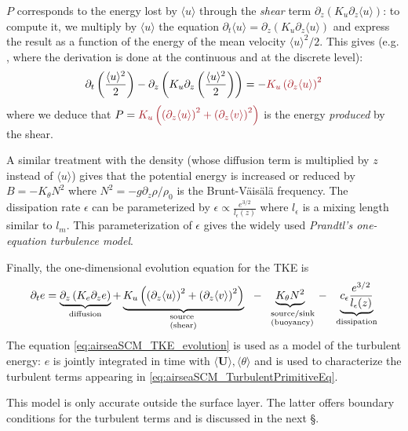 $P$ corresponds to the energy lost by $\langle u \rangle$ through the
\textit{shear} term
$\partial_z \left(K_u \partial_z \langle u \rangle\right)$:
to compute it, we multiply by $\langle u \rangle$ the equation
$\partial_t \langle u \rangle = \partial_z (K_u \partial_z \langle u \rangle)$
and express the result as a function of the
energy of the mean velocity $\displaystyle\langle u \rangle^2/2$.
This gives (e.g. \citep{burchard_energy-conserving_2002},
where the derivation is done at the continuous and at the
discrete level):
\begin{equation}
	\partial_t \left(\frac{\langle u \rangle^2}{2}\right)
	- \partial_z \left(K_u
	\partial_z\left(\frac{\langle u \rangle^2}{2}\right)\right)
	= - \emphase{K_u\left(\partial_z \langle u \rangle\right)^2}
\end{equation}
where we deduce that
$P=\emphase{K_u \left(\left(\partial_z \langle u \rangle\right)^2 +
\left(\partial_z \langle v \rangle\right)^2\right)}$ is the energy
\textit{produced} by the shear.
\par
A similar treatment with the density
(whose diffusion term is multiplied by $z$ instead of $\langle u \rangle$)
gives that the potential energy
is increased or reduced by $B = -K_\theta N^2$ where
$N^2 = - \displaystyle {g\partial_z \rho}/{\rho_0}$ is the Brunt-Väisälä
frequency.
The dissipation rate $\epsilon$ can be parameterized by
$\epsilon \propto \displaystyle \frac{e^{3/2}}{l_{\epsilon}(z)}$
where $l_\epsilon$ is a mixing length similar to $l_m$.
This parameterization of $\epsilon$ gives the widely used
\textit{Prandtl's one-equation turbulence model}.
\par
Finally, the one-dimensional evolution equation for the TKE is
\begin{equation}
\label{eq:airseaSCM_TKE_evolution}
    \begin{aligned}
    \partial_t e =
    \underbrace{\partial_z \left(K_e
    \partial_z e\right)}_{\text{diffusion}}
	    + \underbrace{K_u \left(\left(\partial_z
	    \langle u \rangle\right)^2 +
	    \left(\partial_z \langle v \rangle\right)^2\right)
	    }_{\parbox{25pt}{\scriptsize{ source\\(shear)}}}
    ~~-~~ \underbrace{K_{\theta} N^2
    }_{\parbox{35pt}{\scriptsize{ source/sink\\(buoyancy)}}}
    ~~-~~ \underbrace{c_{\epsilon}
    \frac{e^{3/2}}{l_{\epsilon}(z)}}_{\text{dissipation}}
    \end{aligned}
\end{equation}
The equation \eqref{eq:airseaSCM_TKE_evolution} is used as a model
of the turbulent energy: $e$ is jointly integrated in time with
$\langle \mathbf{U} \rangle, \langle \theta \rangle$
and is used to characterize the turbulent terms appearing
in \eqref{eq:airseaSCM_TurbulentPrimitiveEq}.
\par
This model is only accurate outside the surface layer. The latter
offers boundary conditions for the turbulent terms and is discussed
in the next \S.
